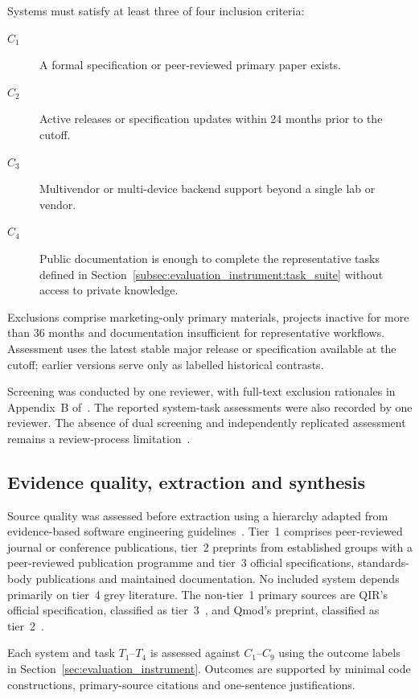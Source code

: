 Systems must satisfy at least three of four inclusion criteria:
\begin{description}
    \item[$C_1$] A formal specification or peer-reviewed primary paper exists.
    \item[$C_2$] Active releases or specification updates within 24 months prior to the cutoff.
    \item[$C_3$] Multivendor or multi-device backend support beyond a single lab or vendor.
    \item[$C_4$] Public documentation is enough to complete the representative tasks defined in Section~\ref{subsec:evaluation_instrument:task_suite} without access to private knowledge.
\end{description}
Exclusions comprise marketing-only primary materials, projects inactive for more than 36 months and documentation insufficient for representative workflows.
Assessment uses the latest stable major release or specification available at the cutoff; earlier versions serve only as labelled historical contrasts.

Screening was conducted by one reviewer, with full-text exclusion rationales in Appendix~B of~\cite{kavadias2026qplSurveySupplementary}.
The reported system-task assessments were also recorded by one reviewer.
The absence of dual screening and independently replicated assessment remains a review-process limitation~\cite{page2021prisma}.

\subsection{Evidence quality, extraction and synthesis}\label{subsec:methodology:quality}
Source quality was assessed before extraction using a hierarchy adapted from evidence-based software engineering guidelines~\cite{KitchenhamCharters2007SLR}.
Tier~1 comprises peer-reviewed journal or conference publications, tier~2 preprints from established groups with a peer-reviewed publication programme and tier~3 official specifications, standards-body publications and maintained documentation.
No included system depends primarily on tier~4 grey literature.
The non-tier~1 primary sources are QIR's official specification, classified as tier~3~\cite{qir_alliance_qir_spec_repo}, and Qmod's preprint, classified as tier~2~\cite{vax2025qmodexpressivehighlevelquantum}.

Each system and task $T_1$--$T_4$ is assessed against $C_1$--$C_9$ using the outcome labels in Section~\ref{sec:evaluation_instrument}.
Outcomes are supported by minimal code constructions, primary-source citations and one-sentence justifications.

